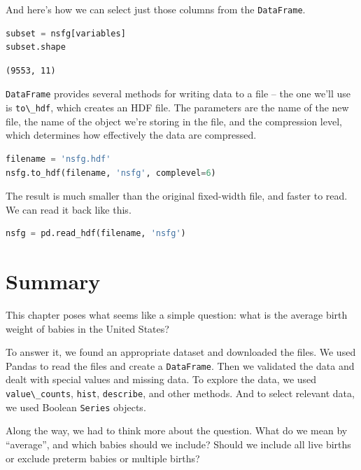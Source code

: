 \documentclass[
]{book}
\newcommand{\passthrough}[1]{#1}
\begin{document}
And here's how we can select just those columns from the
\passthrough{\lstinline!DataFrame!}.

\begin{lstlisting}[language=Python]
subset = nsfg[variables]
subset.shape
\end{lstlisting}

\begin{lstlisting}
(9553, 11)
\end{lstlisting}

\passthrough{\lstinline!DataFrame!} provides several methods for writing
data to a file -- the one we'll use is
\passthrough{\lstinline!to\_hdf!}, which creates an HDF file. The
parameters are the name of the new file, the name of the object we're
storing in the file, and the compression level, which determines how
effectively the data are compressed.

\begin{lstlisting}[language=Python]
filename = 'nsfg.hdf'
nsfg.to_hdf(filename, 'nsfg', complevel=6)
\end{lstlisting}

The result is much smaller than the original fixed-width file, and
faster to read. We can read it back like this.

\begin{lstlisting}[language=Python]
nsfg = pd.read_hdf(filename, 'nsfg')
\end{lstlisting}

\section{Summary}\label{summary}

This chapter poses what seems like a simple question: what is the
average birth weight of babies in the United States?

To answer it, we found an appropriate dataset and downloaded the files.
We used Pandas to read the files and create a
\passthrough{\lstinline!DataFrame!}. Then we validated the data and
dealt with special values and missing data. To explore the data, we used
\passthrough{\lstinline!value\_counts!}, \passthrough{\lstinline!hist!},
\passthrough{\lstinline!describe!}, and other methods. And to select
relevant data, we used Boolean \passthrough{\lstinline!Series!} objects.

Along the way, we had to think more about the question. What do we mean
by ``average'', and which babies should we include? Should we include
all live births or exclude preterm babies or multiple births?
\end{document}
